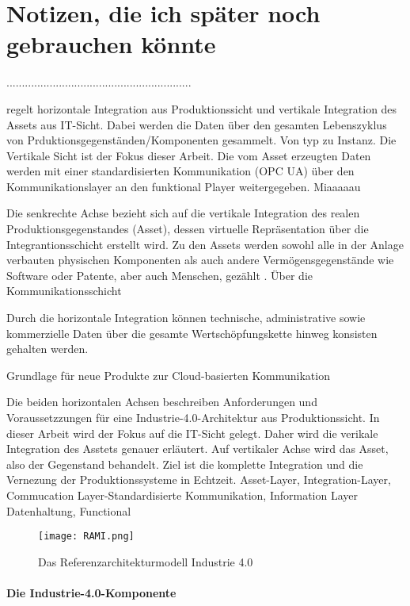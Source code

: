 
\section{Notizen, die ich später noch gebrauchen könnte}
............................................................

regelt horizontale Integration aus Produktionssicht und vertikale Integration des Assets aus IT-Sicht. Dabei werden die Daten über den gesamten Lebenszyklus von Prduktionsgegenständen/Komponenten gesammelt. Von typ zu Instanz.
Die Vertikale Sicht ist der Fokus dieser Arbeit.  Die vom Asset erzeugten Daten werden mit einer standardisierten Kommunikation (OPC UA) über den Kommunikationslayer an den funktional Player weitergegeben. Miaaaaau

Die senkrechte Achse bezieht sich auf die vertikale Integration des realen Produktionsgegenstandes (Asset), dessen virtuelle Repräsentation über die Integrantionsschicht erstellt wird. Zu den Assets werden sowohl alle in der Anlage verbauten physischen Komponenten als auch andere Vermögensgegenstände wie Software oder Patente, aber auch Menschen, gezählt \citep{Adolphs2017}.
 Über die Kommunikationsschicht

 Durch die horizontale Integration können technische, administrative sowie kommerzielle Daten über die gesamte Wertschöpfungskette hinweg konsisten gehalten werden.


Grundlage für neue Produkte zur Cloud-basierten Kommunikation


Die beiden horizontalen Achsen beschreiben Anforderungen und Voraussetzzungen für eine Industrie-4.0-Architektur aus Produktionssicht. In dieser Arbeit wird der Fokus auf die IT-Sicht gelegt. Daher wird die verikale Integration des Asstets genauer erläutert.
Auf vertikaler Achse wird das Asset, also der Gegenstand behandelt. Ziel ist die komplette Integration und die Vernezung der Produktionssysteme in Echtzeit. Asset-Layer, Integration-Layer, Commucation Layer-Standardisierte Kommunikation, Information Layer Datenhaltung, Functional



\begin{figure}[h]
  \texttt{[image: RAMI.png]}
  \caption[Das Referenzarchitekturmodell Industrie 4.0]{Das Referenzarchitekturmodell Industrie 4.0 \citep{BITKOM2015}}
  \label{fig:rami}
\end{figure}

\paragraph{Die Industrie-4.0-Komponente}


